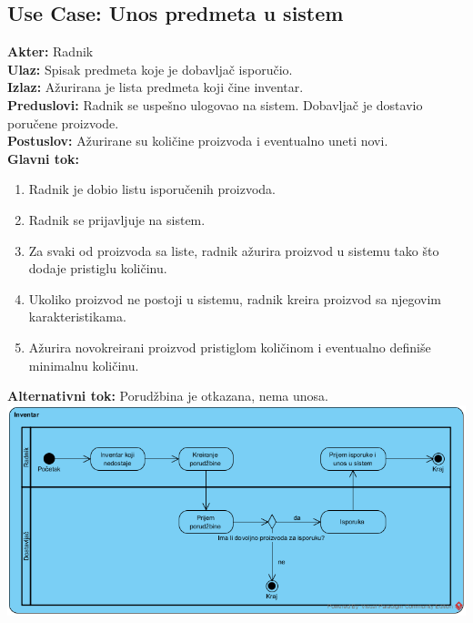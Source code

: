 \documentclass{article}
\begin{document}
\subsection{\textbf{Use Case}: Unos predmeta u sistem}
\textbf{Akter:} Radnik\\
\textbf{Ulaz:} Spisak predmeta koje je dobavljač isporučio.\\
\textbf{Izlaz:} Ažurirana je lista predmeta koji čine inventar.\\
\textbf{Preduslovi:} Radnik se uspešno ulogovao na sistem. Dobavljač je dostavio poručene proizvode.\\
\textbf{Postuslov:} Ažurirane su količine proizvoda i eventualno uneti novi.\\
\textbf{Glavni tok:} 

\begin{enumerate}
	\item Radnik je dobio listu isporučenih proizvoda.
	\item Radnik se prijavljuje na sistem.
	\item Za svaki od proizvoda sa liste, radnik ažurira proizvod u sistemu tako što dodaje pristiglu količinu.
	\item Ukoliko proizvod ne postoji u sistemu, radnik kreira proizvod sa njegovim karakteristikama.
	\item Ažurira novokreirani proizvod pristiglom količinom i eventualno definiše minimalnu količinu. 
\end{enumerate}
\textbf{Alternativni tok:} Porudžbina je otkazana, nema unosa.\\


\includegraphics[width=\textwidth]{pregled_inventara_activity.png}
\end{document}

